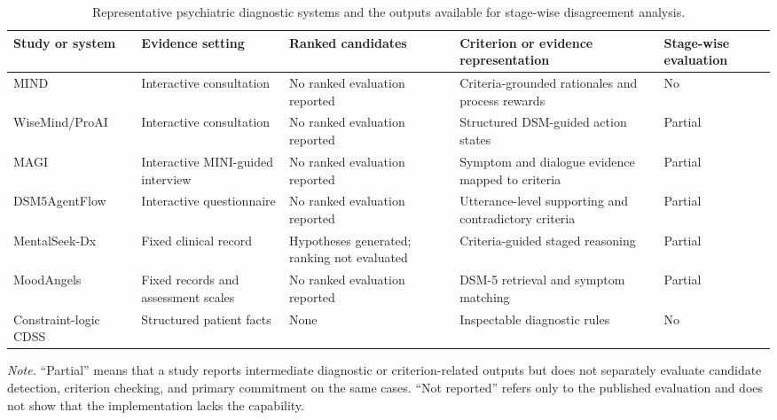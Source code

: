 \begin{table}[htbp]
\centering
\caption{Representative psychiatric diagnostic systems and the outputs available for stage-wise disagreement analysis.}
\label{tab:related-work-matrix}
\small
\begin{adjustbox}{max width=\textwidth}
\begin{tabular}{|>{\raggedright\arraybackslash}p{2.5cm}|>{\raggedright\arraybackslash}p{2.7cm}|>{\raggedright\arraybackslash}p{3.1cm}|>{\raggedright\arraybackslash}p{4.3cm}|>{\centering\arraybackslash}p{2.0cm}|}
\hline
Study or system & Evidence setting & Ranked candidates & Criterion or evidence representation & Stage-wise evaluation\\
\hline
MIND~\citep{li2026mind} & Interactive consultation & No ranked evaluation reported & Criteria-grounded rationales and process rewards & No\\
\hline
WiseMind/\allowbreak ProAI~\citep{wu2026wisemind} & Interactive consultation & No ranked evaluation reported & Structured DSM-guided action states & Partial\\
\hline
MAGI~\citep{bi2025magi} & Interactive MINI-guided interview & No ranked evaluation reported & Symptom and dialogue evidence mapped to criteria & Partial\\
\hline
DSM5Agent\allowbreak Flow~\citep{ozgun2025dsm5agentflow} & Interactive questionnaire & No ranked evaluation reported & Utterance-level supporting and contradictory criteria & Partial\\
\hline
MentalSeek-Dx~\citep{sun2026mentalseek} & Fixed clinical record & Hypotheses generated; ranking not evaluated & Criteria-guided staged reasoning & Partial\\
\hline
Mood\allowbreak Angels~\citep{xiao2025moodangels} & Fixed records and assessment scales & No ranked evaluation reported & DSM-5 retrieval and symptom matching & Partial\\
\hline
Constraint-logic CDSS~\citep{kim2025clp} & Structured patient facts & None & Inspectable diagnostic rules & No\\
\hline
\end{tabular}
\end{adjustbox}

\vspace{0.4em}
\begin{minipage}{0.98\textwidth}
\footnotesize
\textit{Note.} ``Partial'' means that a study reports intermediate diagnostic or criterion-related outputs but does not separately evaluate candidate detection, criterion checking, and primary commitment on the same cases. ``Not reported'' refers only to the published evaluation and does not show that the implementation lacks the capability.
\end{minipage}
\end{table}
\FloatBarrier

